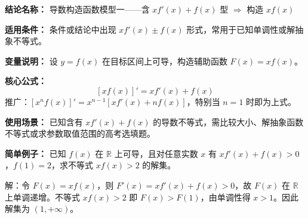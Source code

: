 \textbf{结论名称：} 导数构造函数模型一——含 \(xf'(x)+f(x)\) 型 \(\Rightarrow\) 构造 \(xf(x)\)

\textbf{适用条件：} 条件或结论中出现 \(xf'(x)\pm f(x)\) 形式，常用于已知单调性或解抽象不等式。

\textbf{变量说明：} 设 \(y=f(x)\) 在目标区间上可导，构造辅助函数 \(F(x)=xf(x)\)。

\textbf{核心公式：}
\[
\boxed{[xf(x)]' = xf'(x)+f(x)}
\]
推广：\([x^nf(x)]' = x^{n-1}[xf'(x)+nf(x)]\)，特别当 \(n=1\) 时即为上式。

\textbf{使用场景：} 已知含有 \(xf'(x)+f(x)\) 的导数不等式，需比较大小、解抽象函数不等式或求参数取值范围的高考选填题。

\textbf{简单例子：}
已知 \(f(x)\) 在 \(\mathbb{R}\) 上可导，且对任意实数 \(x\) 有 \(xf'(x)+f(x)>0\)，\(f(1)=2\)，求不等式 \(xf(x)>2\) 的解集。

解：令 \(F(x)=xf(x)\)，则 \(F'(x)=xf'(x)+f(x)>0\)，故 \(F(x)\) 在 \(\mathbb{R}\) 上单调递增。不等式 \(xf(x)>2\) 即 \(F(x)>F(1)\)，由单调性得 \(x>1\)。因此解集为 \((1,+\infty)\)。